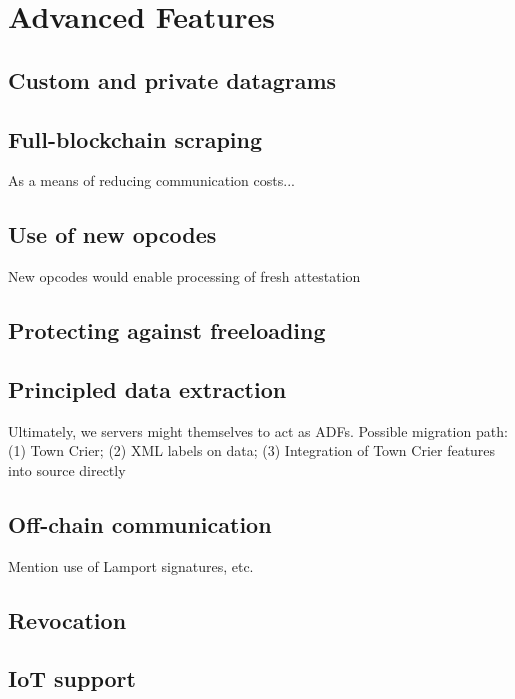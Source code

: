 \section{Advanced Features}
\subsection{Custom and private datagrams}
\subsection{Full-blockchain scraping}
As a means of reducing communication costs...
\subsection{Use of new opcodes}
New opcodes would enable processing of fresh attestation
\subsection{Protecting against freeloading}
\subsection{Principled data extraction}
Ultimately, we servers might themselves to act as ADFs. Possible migration path: (1) Town Crier; (2) XML labels on data; (3) Integration of Town Crier features into source directly
\subsection{Off-chain communication}
Mention use of Lamport signatures, etc.
\subsection{Revocation}
\subsection{IoT support}

